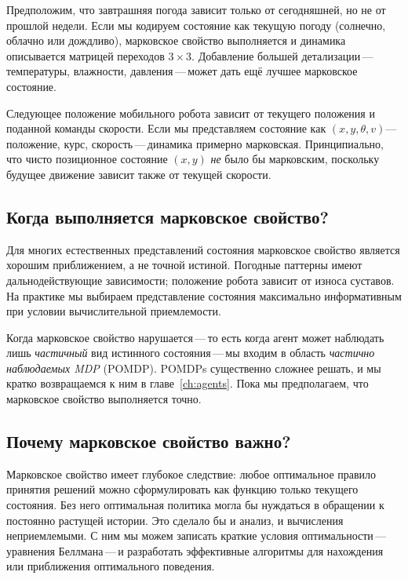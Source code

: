 \begin{example}
\label{ex:weather}
Предположим, что завтрашняя погода зависит только от сегодняшней, но не от прошлой недели. Если мы кодируем состояние как текущую погоду (солнечно, облачно или дождливо), марковское свойство выполняется и динамика описывается матрицей переходов $3 \times 3$. Добавление большей детализации\,---\,температуры, влажности, давления\,---\,может дать ещё лучшее марковское состояние.
\end{example}

\begin{example}
\label{ex:robot-nav}
Следующее положение мобильного робота зависит от текущего положения и поданной команды скорости. Если мы представляем состояние как $(x, y, \theta, v)$---положение, курс, скорость\,---\,динамика примерно марковская. Принципиально, что чисто позиционное состояние $(x, y)$ \emph{не} было бы марковским, поскольку будущее движение зависит также от текущей скорости.
\end{example}

\subsection*{Когда выполняется марковское свойство?}

Для многих естественных представлений состояния марковское свойство является хорошим приближением, а не точной истиной. Погодные паттерны имеют дальнодействующие зависимости; положение робота зависит от износа суставов. На практике мы выбираем представление состояния максимально информативным при условии вычислительной приемлемости.

Когда марковское свойство нарушается\,---\,то есть когда агент может наблюдать лишь \emph{частичный} вид истинного состояния\,---\,мы входим в область \emph{частично наблюдаемых MDP} (POMDP). POMDPs существенно сложнее решать, и мы кратко возвращаемся к ним в главе~\ref{ch:agents}. Пока мы предполагаем, что марковское свойство выполняется точно.

\subsection*{Почему марковское свойство важно?}

Марковское свойство имеет глубокое следствие: любое оптимальное правило принятия решений можно сформулировать как функцию только текущего состояния. Без него оптимальная политика могла бы нуждаться в обращении к постоянно растущей истории. Это сделало бы и анализ, и вычисления неприемлемыми. С ним мы можем записать краткие условия оптимальности\,---\,уравнения Беллмана\,---\,и разработать эффективные алгоритмы для нахождения или приближения оптимального поведения.


